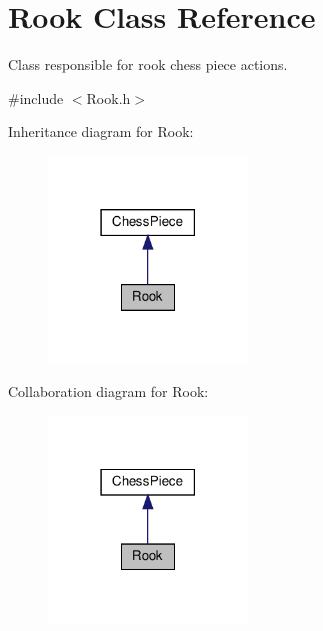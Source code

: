 \hypertarget{classRook}{}\section{Rook Class Reference}
\label{classRook}


Class responsible for rook chess piece actions.  




{\ttfamily \#include $<$Rook.\+h$>$}



Inheritance diagram for Rook\+:\nopagebreak
\begin{figure}[H]
\begin{center}
\leavevmode
\includegraphics[width=150pt]{classRook__inherit__graph}
\end{center}
\end{figure}


Collaboration diagram for Rook\+:\nopagebreak
\begin{figure}[H]
\begin{center}
\leavevmode
\includegraphics[width=150pt]{classRook__coll__graph}
\end{center}
\end{figure}

